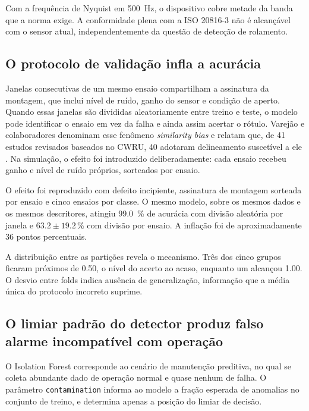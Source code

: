 \documentclass[11pt,a4paper]{article}
\begin{document}
Com a frequência de Nyquist em \SI{500}{\hertz}, o dispositivo cobre metade da banda que a
norma exige. A conformidade plena com a ISO 20816-3 não é alcançável com o sensor atual,
independentemente da questão de detecção de rolamento.

\subsection{O protocolo de validação infla a acurácia}
\label{ssec:vazamento}

Janelas consecutivas de um mesmo ensaio compartilham a assinatura da montagem, que
inclui nível de ruído, ganho do sensor e condição de aperto. Quando essas janelas são
divididas aleatoriamente entre treino e teste, o modelo pode identificar o ensaio em vez
da falha e ainda assim acertar o rótulo. Varejão e colaboradores denominam esse fenômeno
\emph{similarity bias} e relatam que, de \num{41} estudos revisados baseados no CWRU,
\num{40} adotaram delineamento suscetível a ele \cite{varejao2025}. Na simulação, o efeito
foi introduzido deliberadamente: cada ensaio recebeu ganho e nível de ruído próprios,
sorteados por ensaio.

O efeito foi reproduzido com defeito incipiente, assinatura de montagem sorteada por
ensaio e cinco ensaios por classe. O mesmo modelo, sobre os mesmos dados e os mesmos
descritores, atingiu \SI{99,0}{\percent} de acurácia com divisão aleatória por janela e
$\num{63,2} \pm \num{19,2}\,\si{\percent}$ com divisão por ensaio. A inflação foi de aproximadamente
\num{36} pontos percentuais.

A distribuição entre as partições revela o mecanismo. Três dos cinco grupos ficaram
próximos de \num{0,50}, o nível do acerto ao acaso, enquanto um alcançou \num{1,00}. O
desvio entre folds indica ausência de generalização, informação que a média única do
protocolo incorreto suprime.

\subsection{O limiar padrão do detector produz falso alarme incompatível com operação}
\label{ssec:limiar}

O Isolation Forest corresponde ao cenário de manutenção preditiva, no qual se coleta
abundante dado de operação normal e quase nenhum de falha. O parâmetro
\texttt{contamination} informa ao modelo a fração esperada de anomalias no conjunto de
treino, e determina apenas a posição do limiar de decisão.
\end{document}
